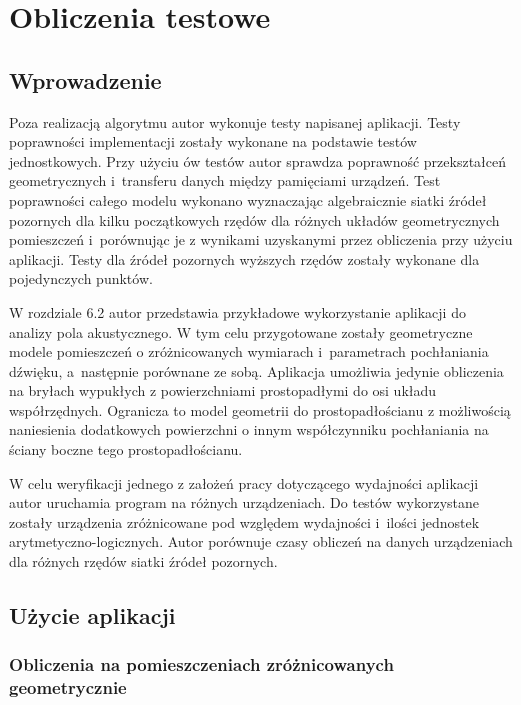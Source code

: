 \chapter{Obliczenia testowe}\label{cha:ot}



\section{Wprowadzenie}\label{sec:wprowadzenie}


Poza realizacją algorytmu autor wykonuje testy napisanej aplikacji. Testy poprawności implementacji zostały wykonane na podstawie testów jednostkowych. Przy użyciu ów testów autor sprawdza poprawność przekształceń geometrycznych i~transferu danych między pamięciami urządzeń. Test poprawności całego modelu wykonano wyznaczając algebraicznie siatki źródeł pozornych dla kilku początkowych rzędów dla różnych układów geometrycznych pomieszczeń i~porównując je z wynikami uzyskanymi przez obliczenia przy użyciu aplikacji. Testy dla źródeł pozornych wyższych rzędów zostały wykonane dla pojedynczych punktów.

W rozdziale 6.2 autor przedstawia przykładowe wykorzystanie aplikacji do analizy pola akustycznego. W tym celu przygotowane zostały geometryczne modele pomieszczeń o zróżnicowanych wymiarach i~parametrach pochłaniania dźwięku, a~następnie  porównane ze sobą. Aplikacja umożliwia jedynie obliczenia na bryłach wypukłych z powierzchniami prostopadłymi do osi układu współrzędnych. Ogranicza to model geometrii do prostopadłościanu z możliwością naniesienia dodatkowych powierzchni o innym współczynniku pochłaniania na ściany boczne tego prostopadłościanu.

W celu weryfikacji jednego z założeń pracy dotyczącego wydajności aplikacji autor uruchamia program na różnych urządzeniach. Do testów wykorzystane zostały urządzenia  zróżnicowane pod względem wydajności i~ilości jednostek arytmetyczno-logicznych. Autor porównuje czasy obliczeń na danych urządzeniach dla różnych rzędów siatki źródeł pozornych.

\section{Użycie aplikacji}\label{sec:asdasd}

\subsection{Obliczenia na pomieszczeniach zróżnicowanych geometrycznie}\label{sec:imstest1}

